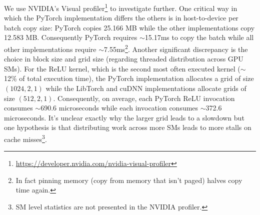 We use NVIDIA's Visual profiler\footnote{\url{https://developer.nvidia.com/nvidia-visual-profiler}} to investigate further.
One critical way in which the PyTorch implementation differs the others is in host-to-device per batch copy size: PyTorch copies 25.166 MB while the other implementations copy 12.583 MB\@.
Consequently PyTorch requires $\sim$15.17ms to copy the batch while all other implementations require $\sim$7.55ms\footnote{In fact pinning memory (copy from memory that isn't paged) halves copy time again.}.
Another significant discrepancy is the choice in block size and grid size (regarding threaded distribution across GPU SMs).
For the ReLU kernel, which is the second most often executed kernel ($\sim$12\% of total execution time), the PyTorch implementation allocates a grid of size $\left( 1024,2,1 \right)$ while the LibTorch and cuDNN implementations allocate grids of size $\left( 512,2,1 \right)$.
Consequently, on average, each PyTorch ReLU invocation consumes $\sim$690.6 microseconds while each invocation consumes $\sim$372.6 microseconds.
It's unclear exactly why the larger grid leads to a slowdown but one hypothesis is that distributing work across more SMs leads to more stalls on cache misses\footnote{SM level statistics are not presented in the NVIDIA profiler.}.



